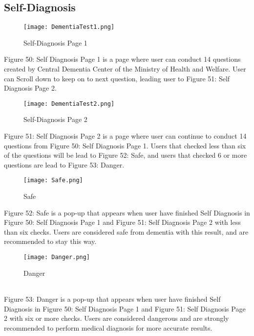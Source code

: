 \documentclass[conference]{IEEEtran}
\begin{document}
\subsection{Self-Diagnosis}
\begin{figure}[h]
\centerline{\texttt{[image: DementiaTest1.png]}}
\caption{Self-Diagnosis Page 1}
\label{fig}
\end{figure}
Figure 50: Self Diagnosis Page 1 is a page where user can conduct 14 questions created by Central Dementia Center of the Ministry of Health and Welfare. User can Scroll down to keep on to next question, leading user to Figure 51: Self Diagnosis Page 2.

\begin{figure}[h]
\centerline{\texttt{[image: DementiaTest2.png]}}
\caption{Self-Diagnosis Page 2}
\label{fig}
\end{figure}
Figure 51: Self Diagnosis Page 2 is a page where user can continue to conduct 14 questions from Figure 50: Self Diagnosis Page 1. Users that checked less than six of the questions will be lead to Figure 52: Safe, and users that checked 6 or more questions are lead to Figure 53: Danger.

\begin{figure}[h]
\centerline{\texttt{[image: Safe.png]}}
\caption{Safe}
\label{fig}
\end{figure}
Figure 52: Safe is a pop-up that appears when user have finished Self Diagnosis in Figure 50: Self Diagnosis Page 1 and Figure 51: Self Diagnosis Page 2 with less than six checks. Users are considered safe from dementia with this result, and are recommended to stay this way.
\\
\begin{figure}[h]
\centerline{\texttt{[image: Danger.png]}}
\caption{Danger}
\label{fig}
\end{figure}
\\
Figure 53: Danger is a pop-up that appears when user have finished Self Diagnosis in Figure 50: Self Diagnosis Page 1 and Figure 51: Self Diagnosis Page 2 with six or more checks. Users are considered dangerous and are strongly recommended to perform medical diagnosis for more accurate results. 
\end{document}
